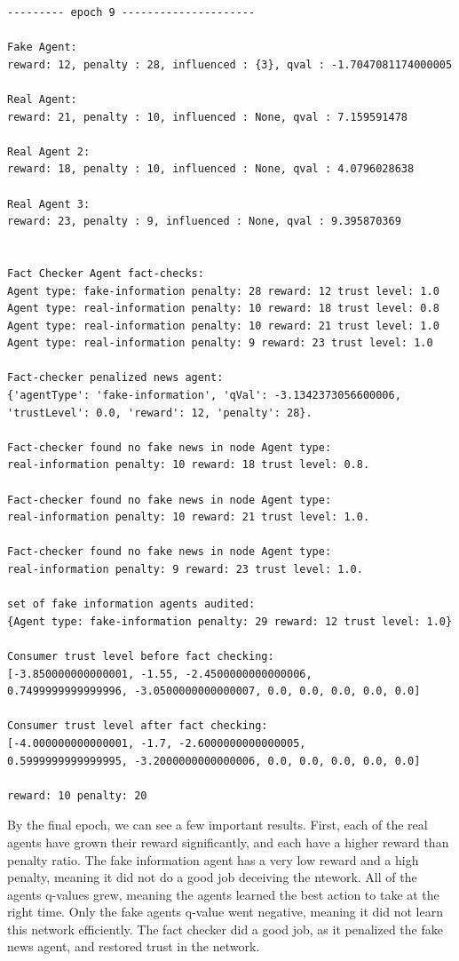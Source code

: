 \documentclass[twoside]{article}
\begin{document}
\begin{verbatim}
--------- epoch 9 ---------------------

Fake Agent: 
reward: 12, penalty : 28, influenced : {3}, qval : -1.7047081174000005

Real Agent: 
reward: 21, penalty : 10, influenced : None, qval : 7.159591478

Real Agent 2: 
reward: 18, penalty : 10, influenced : None, qval : 4.0796028638

Real Agent 3: 
reward: 23, penalty : 9, influenced : None, qval : 9.395870369


Fact Checker Agent fact-checks: 
Agent type: fake-information penalty: 28 reward: 12 trust level: 1.0
Agent type: real-information penalty: 10 reward: 18 trust level: 0.8
Agent type: real-information penalty: 10 reward: 21 trust level: 1.0
Agent type: real-information penalty: 9 reward: 23 trust level: 1.0

Fact-checker penalized news agent: 
{'agentType': 'fake-information', 'qVal': -3.1342373056600006, 
'trustLevel': 0.0, 'reward': 12, 'penalty': 28}.

Fact-checker found no fake news in node Agent type: 
real-information penalty: 10 reward: 18 trust level: 0.8.

Fact-checker found no fake news in node Agent type: 
real-information penalty: 10 reward: 21 trust level: 1.0.

Fact-checker found no fake news in node Agent type: 
real-information penalty: 9 reward: 23 trust level: 1.0.

set of fake information agents audited:  
{Agent type: fake-information penalty: 29 reward: 12 trust level: 1.0}

Consumer trust level before fact checking:  
[-3.850000000000001, -1.55, -2.4500000000000006, 
0.7499999999999996, -3.0500000000000007, 0.0, 0.0, 0.0, 0.0, 0.0]

Consumer trust level after fact checking: 
[-4.000000000000001, -1.7, -2.6000000000000005, 
0.5999999999999995, -3.2000000000000006, 0.0, 0.0, 0.0, 0.0, 0.0]

reward: 10 penalty: 20
\end{verbatim}

By the final epoch, we can see a few important results. First, each of the real agents have grown their reward significantly, and each have a higher reward than penalty ratio. The fake information agent has a very low reward and a high penalty, meaning it did not do a good job deceiving the ntework. All of the agents q-values grew, meaning the agents learned the best action to take at the right time. Only the fake agents q-value went negative, meaning it did not learn this network efficiently. The fact checker did a good job, as it penalized the fake news agent, and restored trust in the network.
\end{document}
